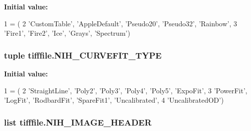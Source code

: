 {\bfseries Initial value\-:}
\begin{DoxyCode}
1 = (
2     \textcolor{stringliteral}{'CustomTable'}, \textcolor{stringliteral}{'AppleDefault'}, \textcolor{stringliteral}{'Pseudo20'}, \textcolor{stringliteral}{'Pseudo32'}, \textcolor{stringliteral}{'Rainbow'},
3     \textcolor{stringliteral}{'Fire1'}, \textcolor{stringliteral}{'Fire2'}, \textcolor{stringliteral}{'Ice'}, \textcolor{stringliteral}{'Grays'}, \textcolor{stringliteral}{'Spectrum'})
\end{DoxyCode}
\hypertarget{namespacetifffile_af09e992d4e37ddf454d4df4e7670902b}{
\subsubsection[{N\-I\-H\-\_\-\-C\-U\-R\-V\-E\-F\-I\-T\-\_\-\-T\-Y\-P\-E}]{\setlength{\rightskip}{0pt plus 5cm}tuple tifffile.\-N\-I\-H\-\_\-\-C\-U\-R\-V\-E\-F\-I\-T\-\_\-\-T\-Y\-P\-E}}\label{namespacetifffile_af09e992d4e37ddf454d4df4e7670902b}
{\bfseries Initial value\-:}
\begin{DoxyCode}
1 = (
2     \textcolor{stringliteral}{'StraightLine'}, \textcolor{stringliteral}{'Poly2'}, \textcolor{stringliteral}{'Poly3'}, \textcolor{stringliteral}{'Poly4'}, \textcolor{stringliteral}{'Poly5'}, \textcolor{stringliteral}{'ExpoFit'},
3     \textcolor{stringliteral}{'PowerFit'}, \textcolor{stringliteral}{'LogFit'}, \textcolor{stringliteral}{'RodbardFit'}, \textcolor{stringliteral}{'SpareFit1'}, \textcolor{stringliteral}{'Uncalibrated'},
4     \textcolor{stringliteral}{'UncalibratedOD'})
\end{DoxyCode}
\hypertarget{namespacetifffile_acf163877284af58b0c492c308be45006}{
\subsubsection[{N\-I\-H\-\_\-\-I\-M\-A\-G\-E\-\_\-\-H\-E\-A\-D\-E\-R}]{\setlength{\rightskip}{0pt plus 5cm}list tifffile.\-N\-I\-H\-\_\-\-I\-M\-A\-G\-E\-\_\-\-H\-E\-A\-D\-E\-R}}\label{namespacetifffile_acf163877284af58b0c492c308be45006}
